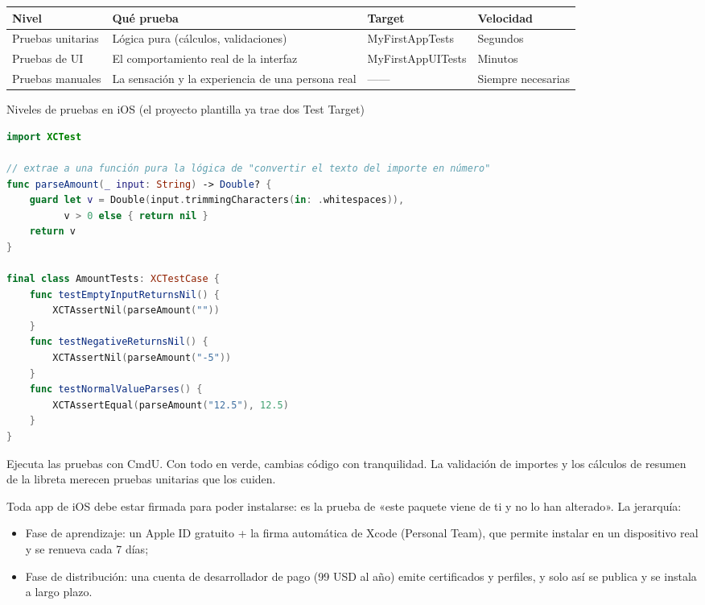 \begin{center}
\begin{tabularx}{\linewidth}{|X|X|X|X|}
\hline
\textbf{Nivel} & \textbf{Qué prueba} & \textbf{Target} & \textbf{Velocidad} \tabularnewline
\hline
Pruebas unitarias & Lógica pura (cálculos, validaciones) & MyFirstAppTests & Segundos \tabularnewline
Pruebas de UI & El comportamiento real de la interfaz & MyFirstAppUITests & Minutos \tabularnewline
Pruebas manuales & La sensación y la experiencia de una persona real & —— & Siempre necesarias \tabularnewline
\hline
\end{tabularx}
\end{center}

\begin{center}\small\color{gray}Niveles de pruebas en iOS (el proyecto plantilla ya trae dos Test Target)\end{center}

\begin{lstlisting}[language=Swift]
import XCTest

// extrae a una función pura la lógica de "convertir el texto del importe en número"
func parseAmount(_ input: String) -> Double? {
    guard let v = Double(input.trimmingCharacters(in: .whitespaces)),
          v > 0 else { return nil }
    return v
}

final class AmountTests: XCTestCase {
    func testEmptyInputReturnsNil() {
        XCTAssertNil(parseAmount(""))
    }
    func testNegativeReturnsNil() {
        XCTAssertNil(parseAmount("-5"))
    }
    func testNormalValueParses() {
        XCTAssertEqual(parseAmount("12.5"), 12.5)
    }
}
\end{lstlisting}

Ejecuta las pruebas con CmdU. Con todo en verde, cambias código con tranquilidad. La validación de importes y los cálculos de resumen de la libreta merecen pruebas unitarias que los cuiden.


Toda app de iOS debe estar firmada para poder instalarse: es la prueba de «este paquete viene de ti y no lo han alterado». La jerarquía:

\begin{itemize}
  \item Fase de aprendizaje: un Apple ID gratuito + la firma automática de Xcode (Personal Team), que permite instalar en un dispositivo real y se renueva cada 7 días;
  \item Fase de distribución: una cuenta de desarrollador de pago (99 USD al año) emite certificados y perfiles, y solo así se publica y se instala a largo plazo.
\end{itemize}

